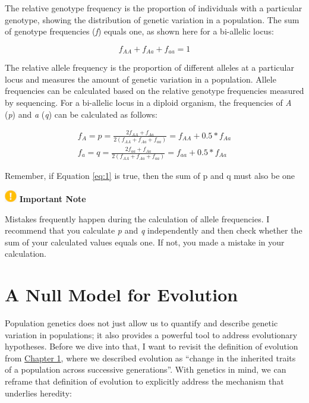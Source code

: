 \documentclass[
]{book}
\begin{document}
The relative genotype frequency is the proportion of individuals with a particular genotype, showing the distribution of genetic variation in a population. The sum of genotype frequencies (\emph{f}) equals one, as shown here for a bi-allelic locus:

\begin{equation} 
f_{AA}+f_{Aa}+f_{aa}=1 \label{eq:1} 
\end{equation}

The relative allele frequency is the proportion of different alleles at a particular locus and measures the amount of genetic variation in a population. Allele frequencies can be calculated based on the relative genotype frequencies measured by sequencing. For a bi-allelic locus in a diploid organism, the frequencies of \emph{A} (\emph{p}) and \emph{a} (\emph{q}) can be calculated as follows:

\begin{align}
f_A=p=\frac{2f_{AA}+f_{Aa}}{2(f_{AA}+f_{Aa}+f_{aa})}=f_{AA}+0.5*f_{Aa} \label{eq:2} \\
f_a=q=\frac{2f_{aa}+f_{Aa}}{2(f_{AA}+f_{Aa}+f_{aa})}=f_{aa}+0.5*f_{Aa} \label{eq:3} 
\end{align}

Remember, if Equation \eqref{eq:1} is true, then the sum of p and q must also be one

\includegraphics[width=0.20833in,height=\textheight]{images/important.png} \textbf{Important Note}

Mistakes frequently happen during the calculation of allele frequencies. I recommend that you calculate \emph{p} and \emph{q} independently and then check whether the sum of your calculated values equals one. If not, you made a mistake in your calculation.

\hypertarget{a-null-model-for-evolution}{%
\section{A Null Model for Evolution}\label{a-null-model-for-evolution}}

Population genetics does not just allow us to quantify and describe genetic variation in populations; it also provides a powerful tool to address evolutionary hypotheses. Before we dive into that, I want to revisit the definition of evolution from \href{what-evolution-is.html\#predictions}{Chapter 1}, where we described evolution as ``change in the inherited traits of a population across successive generations''. With genetics in mind, we can reframe that definition of evolution to explicitly address the mechanism that underlies heredity:
\end{document}
